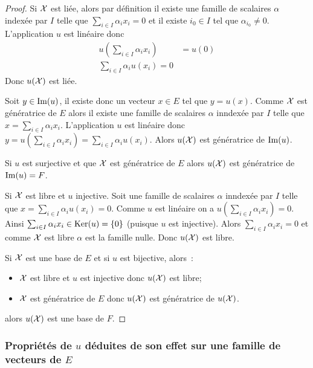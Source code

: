 \begin{proof}
  Si \(\mathcal{X}\) est liée, alors par définition il existe une famille de scalaires \(\alpha\) indexée par \(I\) telle que \(\sum_{i \in I} \alpha_i x_i =0\) et il existe \(i_0 \in I\) tel que \(\alpha_{i_0} \neq 0\). L'application \(u\) est linéaire donc
  \begin{align}
    u\left(\sum_{i \in I} \alpha_i x_i \right) &= u(0) \\
    \sum_{i \in I} \alpha_i u(x_i) =0
  \end{align}
  Donc \(u(\mathcal{X})\) est liée.

  Soit \(y \in \operatorname{Im}(u)\), il existe donc un vecteur \(x \in E\) tel que \(y=u(x)\). Comme \(\mathcal{X}\) est génératrice de \(E\) alors il existe une famille de scalaires \(\alpha\) inndexée par \(I\) telle que \(x = \sum_{i \in I} \alpha_i x_i\). L'application \(u\) est linéaire donc \(y = u\left(\sum_{i \in I} \alpha_i x_i \right)=\sum_{i \in I} \alpha_i u(x_i)\). Alors \(u(\mathcal{X})\) est génératrice de \(\operatorname{Im}(u)\).

  Si \(u\) est surjective et que \(\mathcal{X}\) est génératrice de \(E\) alors \(u(\mathcal{X})\) est génératrice de \(\operatorname{Im}(u)=F\).

  Si \(\mathcal{X}\) est libre et \(u\) injective. Soit une famille de scalaires \(\alpha\) inndexée par \(I\) telle que \(x = \sum_{i \in I} \alpha_i u(x_i)=0\). Comme \(u\) est linéaire on a \(u\left(\sum_{i \in I} \alpha_i x_i \right) =0\). Ainsi \(\sum_{i \in I} \alpha_i x_i \in \operatorname{Ker}(u)=\{0\}\) (puisque \(u\) est injective). Alors \(\sum_{i \in I} \alpha_i x_i = 0\) et comme \(\mathcal{X}\) est libre \(\alpha\) est la famille nulle. Donc \(u(\mathcal{X})\) est libre.

  Si \(\mathcal{X}\) est une base de \(E\) et si \(u\) est bijective, alors~:
  \begin{itemize}
  \item \(\mathcal{X}\) est libre et \(u\) est injective donc \(u(\mathcal{X})\) est libre;
  \item \(\mathcal{X}\) est génératrice de \(E\) donc \(u(\mathcal{X})\) est génératrice de \(u(\mathcal{X})\).
  \end{itemize}
  alors \(u(\mathcal{X})\) est une base de \(F\).
\end{proof}

\subsubsection{Propriétés de \(u\) déduites de son effet sur une famille de vecteurs de \(E\)}

